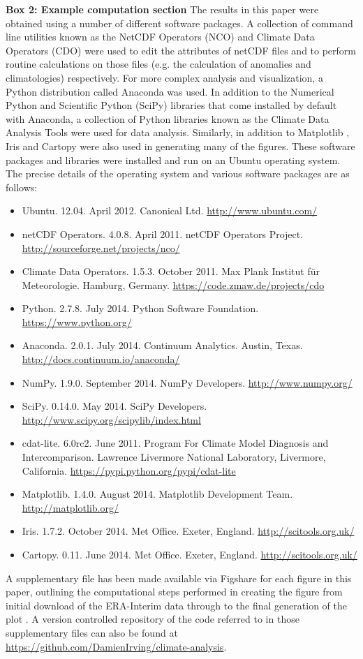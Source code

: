 \textbf{Box 2: Example computation section}
The results in this paper were obtained using a number of different software packages. A collection of command line utilities known as the NetCDF Operators (NCO) and Climate Data Operators (CDO) were used to edit the attributes of netCDF files and to perform routine calculations on those files (e.g. the calculation of anomalies and climatologies) respectively. For more complex analysis and visualization, a Python distribution called Anaconda was used. In addition to the Numerical Python \citep[NumPy;][]{VanDerWalt2011} and Scientific Python (SciPy) libraries that come installed by default with Anaconda, a collection of Python libraries known as the Climate Data Analysis Tools \citep[CDAT;][]{Doutriaux2009} were used for data analysis. Similarly, in addition to Matplotlib \citep[the default Python plotting library;][]{Hunter2007}, Iris and Cartopy were also used in generating many of the figures. These software packages and libraries were installed and run on an Ubuntu operating system. The precise details of the operating system and various software packages are as follows:
\begin{itemize}
\item Ubuntu. 12.04. April 2012. Canonical Ltd. \url{http://www.ubuntu.com/}
\item netCDF Operators. 4.0.8. April 2011. netCDF Operators Project. \url{http://sourceforge.net/projects/nco/}
\item Climate Data Operators. 1.5.3. October 2011. Max Plank Institut f{\"u}r Meteorologie. Hamburg, Germany. \url{https://code.zmaw.de/projects/cdo}
\item Python. 2.7.8. July 2014. Python Software Foundation. \url{https://www.python.org/}
\item Anaconda. 2.0.1. July 2014. Continuum Analytics. Austin, Texas. \url{http://docs.continuum.io/anaconda/}
\item NumPy. 1.9.0. September 2014. NumPy Developers. \url{http://www.numpy.org/}
\item SciPy. 0.14.0. May 2014. SciPy Developers. \url{http://www.scipy.org/scipylib/index.html}
\item cdat-lite. 6.0rc2. June 2011. Program For Climate Model Diagnosis and Intercomparison. Lawrence Livermore National Laboratory, Livermore, California. \url{https://pypi.python.org/pypi/cdat-lite}
\item Matplotlib. 1.4.0. August 2014. Matplotlib Development Team. \url{http://matplotlib.org/}
\item Iris. 1.7.2. October 2014. Met Office. Exeter, England. \url{http://scitools.org.uk/}
\item Cartopy. 0.11. June 2014. Met Office. Exeter, England. \url{http://scitools.org.uk/}
\end{itemize}

A supplementary file has been made available via Figshare for each figure in this paper, outlining the computational steps performed in creating the figure from initial download of the ERA-Interim data through to the final generation of the plot \citep{Irving2015a}. A version controlled repository of the code referred to in those supplementary files can also be found at \url{https://github.com/DamienIrving/climate-analysis}.